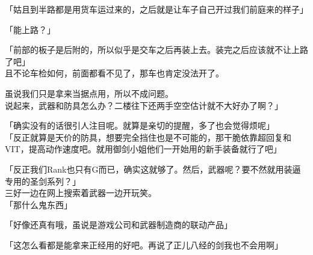 「姑且到半路都是用货车运过来的，之后就是让车子自己开过我们前庭来的样子」

「能上路？」

「前部的板子是后附的，所以似乎是交车之后再装上去。装完之后应该就不让上路了吧」\\

且不论车检如何，前面都看不见了，那车也肯定没法开了。

虽说我们只是拿来当据点用，所以不成问题。\\

说起来，武器和防具怎么办？二楼往下还两手空空估计就不大好办了啊？」

「确实没有的话很引人注目呢。就算是亲切的提醒，多了也会觉得烦呢」\\

「反正就算是天价的防具，想要完全挡住也是不可能的，那干脆依靠超回复和VIT，提高动作速度吧。就用御剑小姐他们一开始用的新手装备就行了吧」

「反正我们Rank也只有G而已，确实这就够了。然后，武器呢？要不然就用装逼专用的圣剑系列？」\\

三好一边在网上搜索着武器一边开玩笑。\\

「那什么鬼东西」

「好像还真有哦，虽说是游戏公司和武器制造商的联动产品」

「这怎么看都是能拿来正经用的好吧。再说了正儿八经的剑我也不会用啊」

